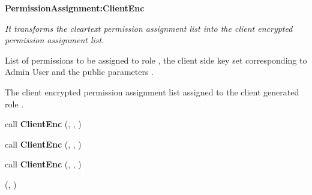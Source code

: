 \documentclass[epsfig,a4paper,11pt,titlepage]{book}
\numberwithin{algorithm}{chapter}
\newcommand{\algofontsize}{\fontsize{11}{12}\selectfont}
\begin{document}
\begin{algorithm} [htp]
{\algofontsize
\caption{\textbf{PermissionAssignment:ClientEnc}}

\label{algo:erbac-deploy-permission-assignment-client-side}

\begin{algorithmic}[1]

\INPUT \emph{It transforms the cleartext permission assignment list into the client encrypted permission assignment list.}

\Require List of permissions  to be assigned to role , the client side key set  corresponding to Admin User  and the public parameters .

\Ensure The client encrypted permission assignment list  assigned to the client generated role .

\medskip

\State  call \textbf{ClientEnc} (, , ) \label{line:erbac-deploy-pa-cs-role}

\State  \label{line:erbac-deploy-pa-cs-init}

 \label{line:erbac-deploy-pa-cs-loop}

	\State  call \textbf{ClientEnc} (, , ) \label{line:erbac-deploy-pa-cs-action}
	
	\State  call \textbf{ClientEnc} (, , ) \label{line:erbac-deploy-pa-cs-target}
	
	\State  \label{line:erbac-deploy-pa-cs-update}

\EndFor

\Return (, )

\end{algorithmic}
}
\end{algorithm}
\end{document}
